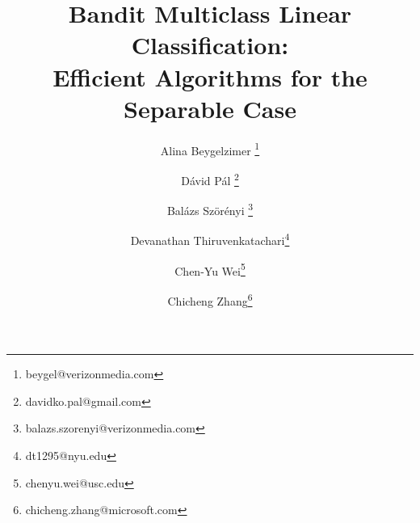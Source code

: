 

\title{Bandit Multiclass Linear Classification: \\ Efficient Algorithms for the Separable Case}

\author[1]{Alina Beygelzimer \thanks{beygel@verizonmedia.com}}
\author[1]{D\'avid P\'al \thanks{davidko.pal@gmail.com}}
\author[1]{Bal\'azs Sz\"or\'enyi \thanks{balazs.szorenyi@verizonmedia.com}}
\author[2]{Devanathan Thiruvenkatachari\thanks{dt1295@nyu.edu}}
\author[3]{Chen-Yu Wei\thanks{chenyu.wei@usc.edu}}
\author[4]{Chicheng Zhang\thanks{chicheng.zhang@microsoft.com}}



\maketitle




